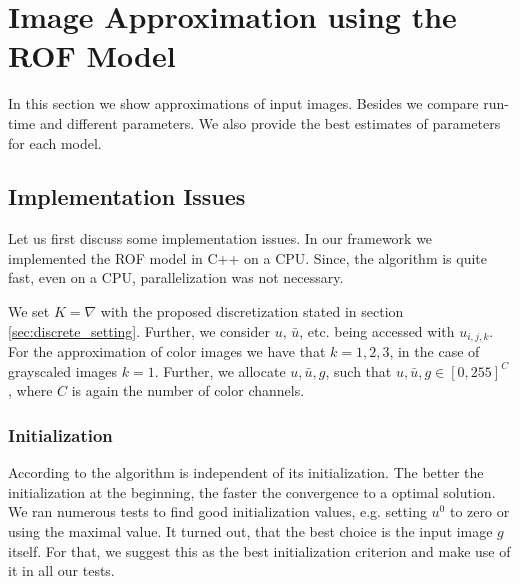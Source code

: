 \documentclass{scrreprt}
\begin{document}

    \section{Image Approximation using the ROF Model} %
    \label{sec:image_approximation_using_the_rof_model}
        
        In this section we show approximations of input images. Besides we compare run-time and different parameters. We also provide the best estimates of parameters for each model.

        \subsection{Implementation Issues} %
        \label{sub:implementation_issues}
            
            Let us first discuss some implementation issues. In our framework we implemented the ROF model in C++ on a CPU. Since, the algorithm is quite fast, even on a CPU, parallelization was not necessary.

            We set $K = \nabla$ with the proposed discretization stated in section \ref{sec:discrete_setting}. Further, we consider $u$, $\bar{u}$, etc. being accessed with $u_{i,j,k}$. For the approximation of color images we have that $k = 1, 2, 3$, in the case of grayscaled images $k = 1$. Further, we allocate $u, \bar{u}, g$, such that $u, \bar{u}, g \in [0,255]^{C}$, where $C$ is again the number of color channels.

            \subsubsection{Initialization}
            \label{sub:initialization}

                According to \cite{Chambolle10afirst-order} the algorithm is independent of its initialization. The better the initialization at the beginning, the faster the convergence to a optimal solution. We ran numerous tests to find good initialization values, e.g. setting $u^{0}$ to zero or using the maximal value. It turned out, that the best choice is the input image $g$ itself. For that, we suggest this as the best initialization criterion and make use of it in all our tests.
\end{document}
